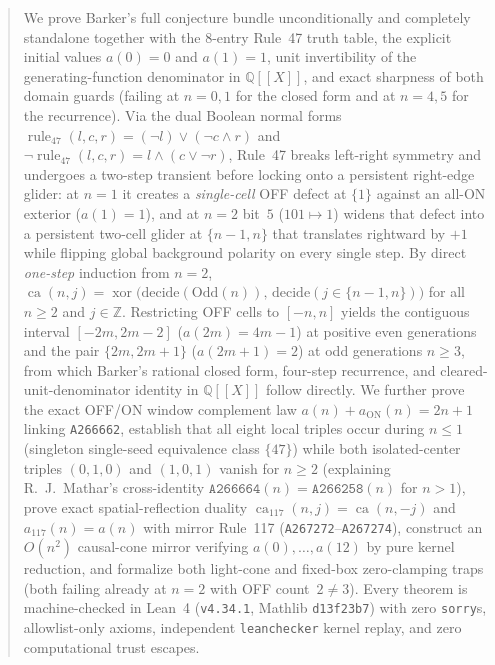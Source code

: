 \documentclass[11pt]{article}
\newcommand{\llbracket}{[\![}
\newcommand{\rrbracket}{]\!]}
\theoremstyle{definition}
\newcommand{\Z}{\mathbb{Z}}
\newcommand{\Q}{\mathbb{Q}}
\newcommand{\seq}[1]{\texttt{#1}}
\newcommand{\ruleFS}{\operatorname{rule}_{47}}
\newcommand{\ca}{\operatorname{ca}}
\begin{document}
\begin{abstract}
We prove Barker's full conjecture bundle unconditionally and completely standalone together with the $8$-entry Rule~47 truth table, the explicit initial values $a(0) = 0$ and $a(1) = 1$, unit invertibility of the generating-function denominator in $\Q\llbracket X \rrbracket$, and exact sharpness of both domain guards (failing at $n = 0, 1$ for the closed form and at $n = 4, 5$ for the recurrence). Via the dual Boolean normal forms $\ruleFS(l, c, r) = (\neg l) \lor (\neg c \land r)$ and $\neg\ruleFS(l, c, r) = l \land (c \lor \neg r)$, Rule~47 breaks left-right symmetry and undergoes a two-step transient before locking onto a persistent right-edge glider: at $n = 1$ it creates a \emph{single-cell} OFF defect at $\{1\}$ against an all-ON exterior ($a(1) = 1$), and at $n = 2$ bit~$5$ ($101 \mapsto 1$) widens that defect into a persistent two-cell glider at $\{n - 1, n\}$ that translates rightward by $+1$ while flipping global background polarity on every single step. By direct \emph{one-step} induction from $n = 2$, $\ca(n, j) = \operatorname{xor}\bigl(\mathrm{decide}(\mathrm{Odd}(n)),\, \mathrm{decide}(j \in \{n - 1, n\})\bigr)$ for all $n \ge 2$ and $j \in \Z$. Restricting OFF cells to $[-n, n]$ yields the contiguous interval $[-2m, 2m - 2]$ ($a(2m) = 4m - 1$) at positive even generations and the pair $\{2m, 2m + 1\}$ ($a(2m + 1) = 2$) at odd generations $n \ge 3$, from which Barker's rational closed form, four-step recurrence, and cleared-unit-denominator identity in $\Q\llbracket X \rrbracket$ follow directly. We further prove the exact OFF/ON window complement law $a(n) + a_{\mathrm{ON}}(n) = 2n + 1$ linking \seq{A266662}, establish that all eight local triples occur during $n \le 1$ (singleton single-seed equivalence class $\{47\}$) while both isolated-center triples $(0, 1, 0)$ and $(1, 0, 1)$ vanish for $n \ge 2$ (explaining R.~J.\ Mathar's cross-identity $\seq{A266664}(n) = \seq{A266258}(n)$ for $n > 1$), prove exact spatial-reflection duality $\ca_{117}(n, j) = \ca(n, -j)$ and $a_{117}(n) = a(n)$ with mirror Rule~117 (\seq{A267272}--\seq{A267274}), construct an $O(n^2)$ causal-cone mirror verifying $a(0), \dots, a(12)$ by pure kernel reduction, and formalize both light-cone and fixed-box zero-clamping traps (both failing already at $n = 2$ with OFF count~$2 \ne 3$). Every theorem is machine-checked in Lean~4 (\texttt{v4.34.1}, Mathlib \texttt{d13f23b7}) with zero \texttt{sorry}s, allowlist-only axioms, independent \texttt{leanchecker} kernel replay, and zero computational trust escapes.
\end{abstract}
\end{document}
